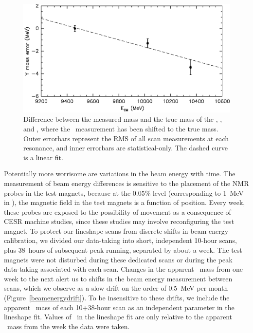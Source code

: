\documentclass{cornell}
\begin{document}
\begin{figure}[p]
  \begin{center}
    \includegraphics[width=\linewidth]{energycalibration}
  \end{center}
  \caption[Beam energy calibration as a function of
  \ecm]{\label{energycalibration} Difference between the measured mass
  and the true mass of the \us, \uss, and \usss, where the \us\
  measurement has been shifted to the true mass.  Outer errorbars
  represent the RMS of all scan measurements at each resonance, and
  inner errorbars are statistical-only.  The dashed curve is a linear
  fit.}
\end{figure}

Potentially more worrisome are variations in the beam energy with
time.  The measurement of beam energy differences is sensitive to the
placement of the NMR probes in the test magnets, because at the 0.05\%
level (corresponding to 1~MeV in \ecm), the magnetic field in the test
magnets is a function of position.  Every week, these probes are
exposed to the possibility of movement as a consequence of CESR
machine studies, since these studies may involve reconfiguring the
test magnet.  To protect our lineshape scans from discrete shifts in
beam energy calibration, we divided our data-taking into short,
independent 10-hour scans, plus 38~hours of subsequent peak running,
separated by about a week.  The test magnets were not disturbed during
these dedicated scans or during the peak data-taking associated with
each scan.  Changes in the apparent \ups\ mass from one week to the
next alert us to shifts in the beam energy measurement between scans,
which we observe as a slow drift on the order of 0.5~MeV per month
(Figure~\ref{beamenergydrift}).  To be insensitive to these drifts, we
include the apparent \ups\ mass of each 10+38-hour scan as an
independent parameter in the lineshape fit. \label{pag:massfloats}
Values of \ecm\ in the lineshape fit are only relative to the apparent
\ups\ mass from the week the data were taken.
\end{document}

